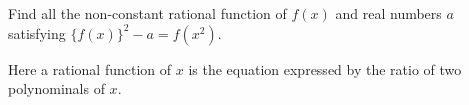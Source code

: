 Find all the non-constant rational function of $f(x)$ and real numbers $a$ satisfying $\{f(x)\}^2-a=f(x^2).$

Here a rational function of $x$ is the equation expressed by the ratio of two polynominals of $x.$